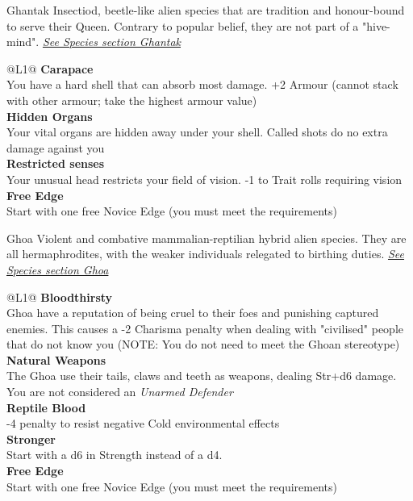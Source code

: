 \begin{genericsection}{Ghantak}
  Insectiod, beetle-like alien species that are tradition and honour-bound to serve their Queen. Contrary to popular belief, they are not part of a "hive-mind". \textit{\hyperref[sec:specie-ghantak]{See Species section Ghantak}}
\end{genericsection}
\begin{redtable}{\linewidth}{@{}L{1}@{}}
  \textbf{Carapace}\\
  You have a hard shell that can absorb most damage. +2 Armour (cannot stack with other armour; take the highest armour value)\\
  \textbf{Hidden Organs}\\
  Your vital organs are hidden away under your shell. Called shots do no extra damage against you\\
  \textbf{Restricted senses}\\
  Your unusual head restricts your field of vision. -1 to Trait rolls requiring vision\\
  \textbf{Free Edge}\\
  Start with one free Novice Edge (you must meet the requirements)\\
\end{redtable}
  
\begin{genericsection}{Ghoa}
  Violent and combative mammalian-reptilian hybrid alien species. They are all hermaphrodites, with the weaker individuals relegated to birthing duties. \textit{\hyperref[sec:specie-ghoa]{See Species section Ghoa}}
\end{genericsection}
\begin{redtable}{\linewidth}{@{}L{1}@{}}
  \textbf{Bloodthirsty}\\
  Ghoa have a reputation of being cruel to their foes and punishing captured enemies. This causes a -2 Charisma penalty when dealing with "civilised" people that do not know you (NOTE: You do not need to meet the Ghoan stereotype)\\
  \textbf{Natural Weapons}\\
  The Ghoa use their tails, claws and teeth as weapons, dealing Str+d6 damage. You are not considered an \textit{Unarmed Defender}\\
  \textbf{Reptile Blood}\\
  -4 penalty to resist negative Cold environmental effects\\
  \textbf{Stronger}\\
  Start with a d6 in Strength instead of a d4.\\
  \textbf{Free Edge}\\
  Start with one free Novice Edge (you must meet the requirements)\\
\end{redtable}
  
